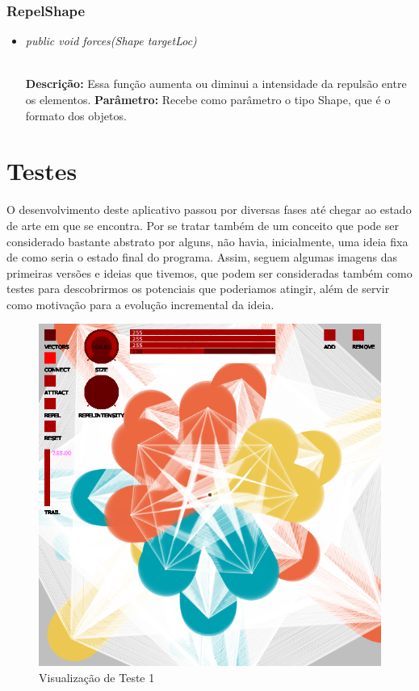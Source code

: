 \documentclass[12pt]{article}
\begin{document}
\vspace{0.2 true cm}

\subsubsection{RepelShape}

\begin{itemize}
\item \begin{large}\textit{public void forces(Shape targetLoc)}\end{large}\\
\subitem \textbf{Descrição:} Essa função aumenta ou diminui a intensidade da repulsão entre os elementos.
\subitem \textbf{Parâmetro:} Recebe como parâmetro o tipo Shape, que é o formato dos objetos.
\end{itemize}

\vspace{0.2 true cm}

\section{Testes}
\label{testes}
O desenvolvimento deste aplicativo passou por diversas fases até chegar ao estado de arte em que se encontra. Por se tratar também de um conceito que pode ser considerado bastante abstrato por alguns, não havia, inicialmente, uma ideia fixa de como seria o estado final do programa. Assim, seguem algumas imagens das primeiras versões e ideias que tivemos, que podem ser consideradas também como testes para descobrirmos os potenciais que poderiamos atingir, além de servir como motivação para a evolução incremental da ideia.

\begin{figure}[h!]
	\centering
	\includegraphics[width=.8\textwidth]{teste1.png}
	\caption{Visualização de Teste 1}
	\label{umlfull}
\end{figure}
\end{document}
